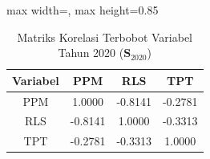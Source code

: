 \begin{table}[H]
\centering
\caption{Matriks Korelasi Terbobot Variabel Tahun 2020 ($\mathbf{S}_{2020}$)} \label{tab:sample1matriks_intra_loading_2020}
\begin{adjustbox}{max width=\textwidth, max height=0.85\textheight}
\begin{tabular}{|c|c|c|c|}
\hline
\textbf{Variabel} & \textbf{PPM} & \textbf{RLS} & \textbf{TPT} \\
\hline
PPM & 1.0000 & -0.8141 & -0.2781 \\
RLS & -0.8141 & 1.0000 & -0.3313 \\
TPT & -0.2781 & -0.3313 & 1.0000 \\
\hline
\end{tabular}
\end{adjustbox}
\end{table}